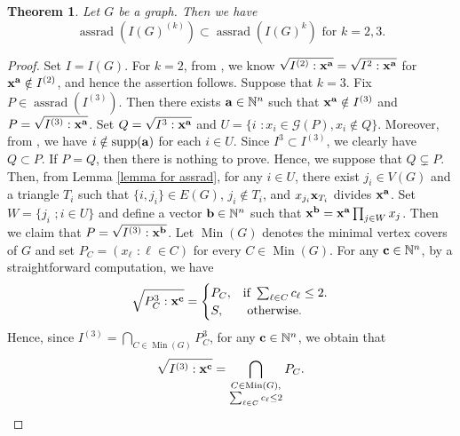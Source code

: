 \documentclass[12pt]{amsart}
\newtheorem{thm}{Theorem}[section]
\theoremstyle{definition}
\theoremstyle{remark}
\DeclareMathOperator{\supp}{supp}
\DeclareMathOperator{\Min}{Min}
\DeclareMathOperator{\assrad}{assrad}
\begin{document}
\begin{thm}\label{assrad}
Let $G$ be a graph. Then we have 
$$\assrad(I(G)^{(k)})\subset\assrad(I(G)^{k})\mbox{ for }k=2,3.$$
\end{thm}
\begin{proof}
Set $I=I(G)$. For $k=2$, from \cite[Lemma 3.1]{mnptv2022}, we know $\sqrt{I^{(2)}:{\bf x}^{\bf a}}=\sqrt{I^{2}:{\bf x}^{\bf a}}$ for ${\bf x}^{\bf a}\notin I^{(2)}$, and hence the assertion follows. Suppose that $k=3$. Fix $P\in\assrad(I^{(3)})$. Then there exists ${\bf a}\in\mathbb{N}^{n}$ such that ${\bf x}^{\bf a}\notin I^{(3)}$ and $P=\sqrt{I^{(3)}:{\bf x}^{\bf a}}$. Set $Q=\sqrt{I^{3}:{\bf x}^{\bf a}}$ and $U=\{i\,\,: x_{i}\in\mathcal{G}(P), x_{i}\notin Q\}$. Moreover, from \cite[Lemma 4.1]{mnptv2022}, we have $i\notin\supp({\bf a})$ for each $i\in U$. Since $I^{3}\subset I^{(3)}$, we clearly have $Q\subset P$. If $P=Q$, then there is nothing to prove. Hence, we suppose that $Q\subsetneq P$. Then, from Lemma \ref{lemma for assrad}, for any $i\in U$, there exist $j_{i}\in V(G)$ and a triangle $T_{i}$ such that $\{i,j_{i}\}\in E(G)$, $j_{i}\notin T_{i}$, and $x_{j_{i}}{\bf x}_{T_{i}}$ divides ${\bf x}^{\bf a}$. Set $W=\{j_{i}\,\,; i\in U\}$ and define a vector ${\bf b}\in\mathbb{N}^{n}$ such that ${\bf x}^{\bf b}={\bf x}^{\bf a}\prod_{j\in W}x_{j}$. Then we claim that $P=\sqrt{I^{(3)}:{\bf x}^{\bf b}}$. Let $\Min(G)$ denotes the minimal vertex covers of $G$ and set $P_{C}=(x_{\ell}\,\,: \ell\in C)$ for every $C\in\Min(G)$. For any ${\bf c}\in\mathbb{N}^{n}$, by a straightforward computation, we have 
\[
\sqrt{P_{C}^{3}:{\bf x}^{\bf c}}=
\begin{cases}
P_{C}, & \text{if } \sum_{\ell\in C}c_{\ell}\leq2. \\
S, & \text{ otherwise.}
\end{cases}
\]
Hence, since $I^{(3)}=\bigcap_{C\in\Min(G)}P_{C}^{3}$, for any ${\bf c}\in\mathbb{N}^{n}$, we obtain that $$\sqrt{I^{(3)}:{\bf x}^{\bf c}}=\bigcap_{\substack{C\in\Min(G), \\\sum_{\ell\in C}c_{\ell}\leq2}}P_{C}.$$

\end{proof}
\end{document}
